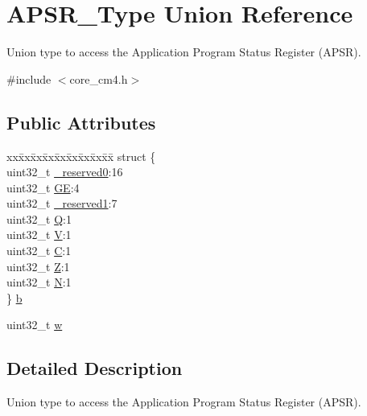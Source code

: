 \hypertarget{union_a_p_s_r___type}{}\section{A\+P\+S\+R\+\_\+\+Type Union Reference}
\label{union_a_p_s_r___type}


Union type to access the Application Program Status Register (A\+P\+SR).  




{\ttfamily \#include $<$core\+\_\+cm4.\+h$>$}

\subsection*{Public Attributes}
\begin{DoxyCompactItemize}
\item 
\begin{tabbing}
xx\=xx\=xx\=xx\=xx\=xx\=xx\=xx\=xx\=\kill
struct \{\\
\>uint32\_t \hyperlink{union_a_p_s_r___type_afbce95646fd514c10aa85ec0a33db728}{\_reserved0}:16\\
\>uint32\_t \hyperlink{union_a_p_s_r___type_adcb98a5b9c93b0cb69cdb7af5638f32e}{GE}:4\\
\>uint32\_t \hyperlink{union_a_p_s_r___type_ac681f266e20b3b3591b961e13633ae13}{\_reserved1}:7\\
\>uint32\_t \hyperlink{union_a_p_s_r___type_a22d10913489d24ab08bd83457daa88de}{Q}:1\\
\>uint32\_t \hyperlink{union_a_p_s_r___type_a8004d224aacb78ca37774c35f9156e7e}{V}:1\\
\>uint32\_t \hyperlink{union_a_p_s_r___type_a86e2c5b891ecef1ab55b1edac0da79a6}{C}:1\\
\>uint32\_t \hyperlink{union_a_p_s_r___type_a3b04d58738b66a28ff13f23d8b0ba7e5}{Z}:1\\
\>uint32\_t \hyperlink{union_a_p_s_r___type_a7e7bbba9b00b0bb3283dc07f1abe37e0}{N}:1\\
\} \hyperlink{union_a_p_s_r___type_a7dbc79a057ded4b11ca5323fc2d5ab14}{b}\\

\end{tabbing}\item 
uint32\+\_\+t \hyperlink{union_a_p_s_r___type_ae4c2ef8c9430d7b7bef5cbfbbaed3a94}{w}
\end{DoxyCompactItemize}


\subsection{Detailed Description}
Union type to access the Application Program Status Register (A\+P\+SR). 

